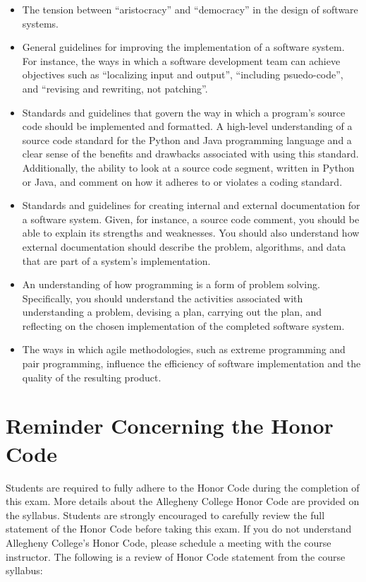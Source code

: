 \documentclass[11pt]{article}
\begin{document}
\begin{itemize}
  \item The tension between ``aristocracy'' and ``democracy'' in the design of
    software systems.

  \item General guidelines for improving the implementation of a software
    system. For instance, the ways in which a software development team can
    achieve objectives such as ``localizing input and output'', ``including
    psuedo-code'', and ``revising and rewriting, not patching''.

  \item Standards and guidelines that govern the way in which a program's source
    code should be implemented and formatted. A high-level understanding of a
    source code standard for the Python and Java programming language and a
    clear sense of the benefits and drawbacks associated with using this
    standard. Additionally, the ability to look at a source code segment,
    written in Python or Java, and comment on how it adheres to or violates a
    coding standard.

  \item Standards and guidelines for creating internal and external
    documentation for a software system. Given, for instance, a source code
    comment, you should be able to explain its strengths and weaknesses. You
    should also understand how external documentation should describe the
    problem, algorithms, and data that are part of a system's implementation.

  \item An understanding of how programming is a form of problem solving.
    Specifically, you should understand the activities associated with
    understanding a problem, devising a plan, carrying out the plan, and
    reflecting on the chosen implementation of the completed software system.

  \item The ways in which agile methodologies, such as extreme programming and
    pair programming, influence the efficiency of software implementation and
    the quality of the resulting product.

\end{itemize}

\section*{Reminder Concerning the Honor Code}

\noindent Students are required to fully adhere to the Honor Code during the
completion of this exam. More details about the Allegheny College Honor Code are
provided on the syllabus. Students are strongly encouraged to carefully review
the full statement of the Honor Code before taking this exam. If you do not
understand Allegheny College's Honor Code, please schedule a meeting with the
course instructor. The following is a review of Honor Code statement from the
course syllabus:
\end{document}

